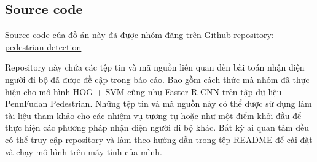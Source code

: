 \subsection{Source code}
Source code của đồ án này đã được nhóm đăng trên Github repository: \href{https://github.com/blkhanhlinh/pedestrian-detection}{\underline{pedestrian-detection}}

Repository này chứa các tệp tin và mã nguồn liên quan đến bài toán nhận diện người đi bộ đã được đề cập trong báo cáo. Bao gồm cách thức mà nhóm đã thực hiện cho mô hình HOG + SVM cũng như Faster R-CNN trên tập dữ liệu PennFudan Pedestrian. Những tệp tin và mã nguồn này có thể được sử dụng làm tài liệu tham khảo cho các nhiệm vụ tương tự hoặc như một điểm khởi đầu để thực hiện các phương pháp nhận diện người đi bộ khác. Bất kỳ ai quan tâm đều có thể truy cập repository và làm theo hướng dẫn trong tệp README để cài đặt và chạy mô hình trên máy tính của mình. 